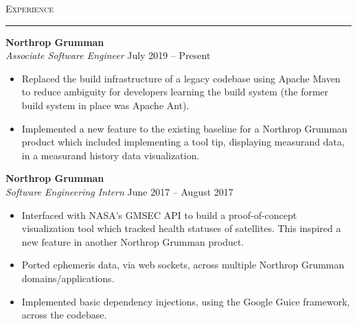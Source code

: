\documentclass{res}
\begin{document}
\begin{resume}
\textsc{{\Large Experience}}
\vspace{0.5mm}
\hrule width18.5cm
\textbf{Northrop Grumman}\\
\textit{Associate Software Engineer}
\hfill
July 2019 -- Present\\[1mm]
	\begin{itemize}
		\vspace{-3mm}
    \item Replaced the build infrastructure of a legacy codebase using Apache Maven to reduce ambiguity for developers learning the build system (the former build system in place was Apache Ant).
    \item Implemented a new feature to the existing baseline for a Northrop Grumman product which included implementing a tool tip, displaying measurand data, in a measurand history data visualization.
	\end{itemize}
\textbf{Northrop Grumman}\\
\textit{Software Engineering Intern}
\hfill
June 2017 -- August 2017\\[1mm]
	\begin{itemize}
		\vspace{-3mm}
		\item Interfaced with NASA's GMSEC API to build a proof-of-concept visualization tool which tracked health statuses of satellites. This inspired a new feature in another Northrop Grumman product.
		\item Ported ephemeris data, via web sockets, across multiple Northrop Grumman domains/applications.
		\item Implemented basic dependency injections, using the Google Guice framework, across the codebase.
	\end{itemize}


\end{resume}
\end{document}
